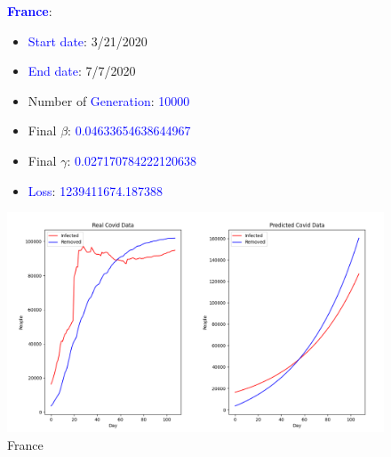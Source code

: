\documentclass[a4paper]{article}
\begin{document}
    \begin{figure}[ht]
    \centering
    \textbf{\textcolor{blue}{France}}: 
    \begin{itemize}
        \item \textcolor{blue}{Start date}: 3/21/2020
        \item \textcolor{blue}{End date}: 7/7/2020
        \item Number of \textcolor{blue}{Generation}: \textcolor{blue}{10000}
        \item Final $\beta$: \textcolor{blue}{0.04633654638644967}
        \item Final $\gamma$: \textcolor{blue}{0.027170784222120638}
        \item \textcolor{blue}{Loss}: \textcolor{blue}{1239411674.187388}
    \end{itemize}
    
    \includegraphics[width= \linewidth]{ex5-plot/France.png}
    
    \caption{France}
    \end{figure}
\end{document}
